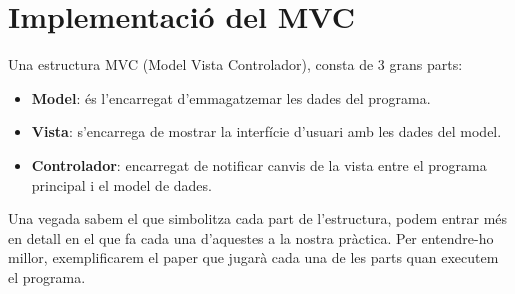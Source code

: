 \documentclass[conference]{IEEEtran}
\begin{document}
\section{Implementació del MVC}
Una estructura MVC (Model Vista Controlador), consta de 3 grans parts: 
\begin{itemize}
  \item \textbf{Model}: és l'encarregat d'emmagatzemar les dades del programa.\\
  \item \textbf{Vista}: s'encarrega de mostrar la interfície d'usuari amb les dades del model.\\
  \item \textbf{Controlador}: encarregat de notificar canvis de la vista entre el programa principal i el model de dades.\\
\end{itemize}
 Una vegada sabem el que simbolitza cada part de l'estructura, podem entrar més en detall en el que fa cada una d'aquestes a la nostra pràctica. Per entendre-ho millor, exemplificarem el paper que jugarà cada una de les parts quan executem el programa.
\end{document}
